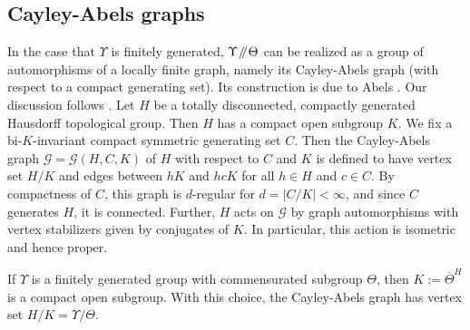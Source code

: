 \documentclass[11pt]{article}
\numberwithin{equation}{section}\providecommand{\llangle}{\langle\!\langle}\providecommand{\rrangle}{\rangle\!\rangle}\providecommand{\Asterisk}{\ast}
\newcommand{\Y}{\ensuremath{\Upsilon}}
\newcommand{\sslash}{\mathbin{\mkern-3mu /\mkern-5mu/ \mkern-3mu}}
\newcommand{\calG}{\ensuremath{\mathcal{G}}}
\theoremstyle{definition}
\begin{document}
\subsection{Cayley-Abels graphs}\label{sec:ca-graphs}
In the case that $\Y$ is finitely generated, $\Y\sslash\Theta$ can be realized as a group of automorphisms of a locally finite graph, namely its Cayley-Abels graph (with respect to a compact generating set). Its construction is due to Abels \cite{abels-cayley}. Our discussion follows \cite[11.3]{monod-book}. Let $H$ be a totally disconnected, compactly generated Hausdorff topological group. Then $H$ has a compact open subgroup $K$. We fix a bi-$K$-invariant compact symmetric generating set $C$. Then the Cayley-Abels graph $\calG=\calG(H,C, K)$ of $H$ with respect to $C$ and $K$ is defined to have vertex set $H/K$ and edges between $hK$ and $hcK$ for all $h\in H$ and $c\in C$. By compactness of $C$, this graph is $d$-regular for $d=|C/K|<\infty$, and since $C$ generates $H$, it is connected. Further, $H$ acts on $\calG$ by graph automorphisms with vertex stabilizers given by conjugates of $K$. In particular, this action is isometric and hence proper.

If $\Y$ is a finitely generated group with commensurated subgroup $\Theta$, then $K:=\overline{\Theta}^H$ is a compact open subgroup. With this choice, the Cayley-Abels graph has vertex set $H/K=\Y/\Theta$.
\end{document}
